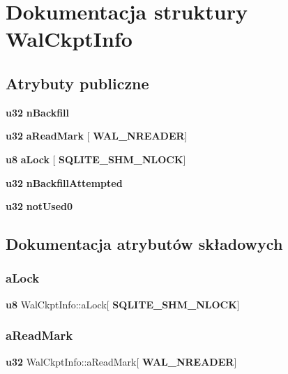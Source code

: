 \section{Dokumentacja struktury Wal\+Ckpt\+Info}
\label{struct_wal_ckpt_info}
\subsection*{Atrybuty publiczne}
\begin{DoxyCompactItemize}
\item 
\textbf{ u32} \textbf{ n\+Backfill}
\item 
\textbf{ u32} \textbf{ a\+Read\+Mark} [\textbf{ W\+A\+L\+\_\+\+N\+R\+E\+A\+D\+ER}]
\item 
\textbf{ u8} \textbf{ a\+Lock} [\textbf{ S\+Q\+L\+I\+T\+E\+\_\+\+S\+H\+M\+\_\+\+N\+L\+O\+CK}]
\item 
\textbf{ u32} \textbf{ n\+Backfill\+Attempted}
\item 
\textbf{ u32} \textbf{ not\+Used0}
\end{DoxyCompactItemize}


\subsection{Dokumentacja atrybutów składowych}
\mbox{\label{struct_wal_ckpt_info_a0aaaef8cfe5d45c613de6b63ea185d41}} 
\subsubsection{aLock}
{\footnotesize\ttfamily \textbf{ u8} Wal\+Ckpt\+Info\+::a\+Lock[\textbf{ S\+Q\+L\+I\+T\+E\+\_\+\+S\+H\+M\+\_\+\+N\+L\+O\+CK}]}

\mbox{\label{struct_wal_ckpt_info_a3bc01a8244045941d5f59f01123a7735}} 
\subsubsection{aReadMark}
{\footnotesize\ttfamily \textbf{ u32} Wal\+Ckpt\+Info\+::a\+Read\+Mark[\textbf{ W\+A\+L\+\_\+\+N\+R\+E\+A\+D\+ER}]}

\mbox{\label{struct_wal_ckpt_info_a5185e508f7da44c391b692e957a84ff6}} 
